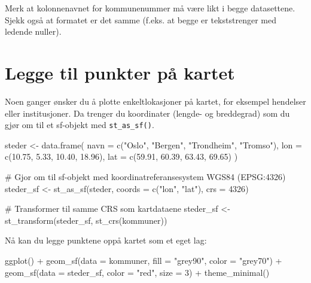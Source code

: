 \documentclass[
  norsk,
  letterpaper,
  DIV=11,
  numbers=noendperiod]{scrreprt}
\newenvironment{Shaded}{\begin{snugshade}}{\end{snugshade}}
\newcommand{\AttributeTok}[1]{\textcolor[rgb]{0.40,0.45,0.13}{#1}}
\newcommand{\CommentTok}[1]{\textcolor[rgb]{0.37,0.37,0.37}{#1}}
\newcommand{\DecValTok}[1]{\textcolor[rgb]{0.68,0.00,0.00}{#1}}
\newcommand{\FloatTok}[1]{\textcolor[rgb]{0.68,0.00,0.00}{#1}}
\newcommand{\FunctionTok}[1]{\textcolor[rgb]{0.28,0.35,0.67}{#1}}
\newcommand{\NormalTok}[1]{\textcolor[rgb]{0.00,0.23,0.31}{#1}}
\newcommand{\OtherTok}[1]{\textcolor[rgb]{0.00,0.23,0.31}{#1}}
\newcommand{\SpecialCharTok}[1]{\textcolor[rgb]{0.37,0.37,0.37}{#1}}
\newcommand{\StringTok}[1]{\textcolor[rgb]{0.13,0.47,0.30}{#1}}
\theoremstyle{definition}
\theoremstyle{remark}
\begin{document}
Merk at kolonnenavnet for kommunenummer må være likt i begge
datasettene. Sjekk også at formatet er det samme (f.eks. at begge er
tekststrenger med ledende nuller).

\section{Legge til punkter på
kartet}\label{legge-til-punkter-puxe5-kartet}

Noen ganger ønsker du å plotte enkeltlokasjoner på kartet, for eksempel
hendelser eller institusjoner. Da trenger du koordinater (lengde- og
breddegrad) som du gjør om til et sf-objekt med \texttt{st\_as\_sf()}.

\begin{Shaded}
\begin{Highlighting}[]
\NormalTok{steder }\OtherTok{\textless{}{-}} \FunctionTok{data.frame}\NormalTok{(}
  \AttributeTok{navn =} \FunctionTok{c}\NormalTok{(}\StringTok{"Oslo"}\NormalTok{, }\StringTok{"Bergen"}\NormalTok{, }\StringTok{"Trondheim"}\NormalTok{, }\StringTok{"Tromso"}\NormalTok{),}
  \AttributeTok{lon =} \FunctionTok{c}\NormalTok{(}\FloatTok{10.75}\NormalTok{, }\FloatTok{5.33}\NormalTok{, }\FloatTok{10.40}\NormalTok{, }\FloatTok{18.96}\NormalTok{),}
  \AttributeTok{lat =} \FunctionTok{c}\NormalTok{(}\FloatTok{59.91}\NormalTok{, }\FloatTok{60.39}\NormalTok{, }\FloatTok{63.43}\NormalTok{, }\FloatTok{69.65}\NormalTok{)}
\NormalTok{)}

\CommentTok{\# Gjor om til sf{-}objekt med koordinatreferansesystem WGS84 (EPSG:4326)}
\NormalTok{steder\_sf }\OtherTok{\textless{}{-}} \FunctionTok{st\_as\_sf}\NormalTok{(steder, }\AttributeTok{coords =} \FunctionTok{c}\NormalTok{(}\StringTok{"lon"}\NormalTok{, }\StringTok{"lat"}\NormalTok{), }\AttributeTok{crs =} \DecValTok{4326}\NormalTok{)}

\CommentTok{\# Transformer til samme CRS som kartdataene}
\NormalTok{steder\_sf }\OtherTok{\textless{}{-}} \FunctionTok{st\_transform}\NormalTok{(steder\_sf, }\FunctionTok{st\_crs}\NormalTok{(kommuner))}
\end{Highlighting}
\end{Shaded}

Nå kan du legge punktene oppå kartet som et eget lag:

\begin{Shaded}
\begin{Highlighting}[]
\FunctionTok{ggplot}\NormalTok{() }\SpecialCharTok{+}
  \FunctionTok{geom\_sf}\NormalTok{(}\AttributeTok{data =}\NormalTok{ kommuner, }\AttributeTok{fill =} \StringTok{"grey90"}\NormalTok{, }\AttributeTok{color =} \StringTok{"grey70"}\NormalTok{) }\SpecialCharTok{+}
  \FunctionTok{geom\_sf}\NormalTok{(}\AttributeTok{data =}\NormalTok{ steder\_sf, }\AttributeTok{color =} \StringTok{"red"}\NormalTok{, }\AttributeTok{size =} \DecValTok{3}\NormalTok{) }\SpecialCharTok{+}
  \FunctionTok{theme\_minimal}\NormalTok{()}
\end{Highlighting}
\end{Shaded}
\end{document}
